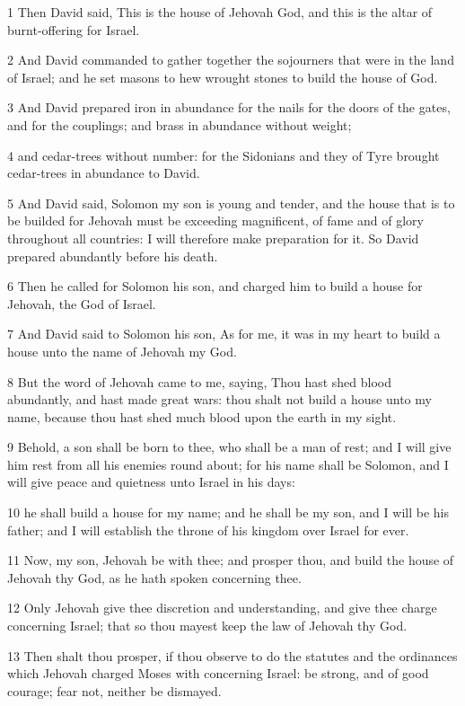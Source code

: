 \par 1 Then David said, This is the house of Jehovah God, and this is the altar of burnt-offering for Israel.
\par 2 And David commanded to gather together the sojourners that were in the land of Israel; and he set masons to hew wrought stones to build the house of God.
\par 3 And David prepared iron in abundance for the nails for the doors of the gates, and for the couplings; and brass in abundance without weight;
\par 4 and cedar-trees without number: for the Sidonians and they of Tyre brought cedar-trees in abundance to David.
\par 5 And David said, Solomon my son is young and tender, and the house that is to be builded for Jehovah must be exceeding magnificent, of fame and of glory throughout all countries: I will therefore make preparation for it. So David prepared abundantly before his death.
\par 6 Then he called for Solomon his son, and charged him to build a house for Jehovah, the God of Israel.
\par 7 And David said to Solomon his son, As for me, it was in my heart to build a house unto the name of Jehovah my God.
\par 8 But the word of Jehovah came to me, saying, Thou hast shed blood abundantly, and hast made great wars: thou shalt not build a house unto my name, because thou hast shed much blood upon the earth in my sight.
\par 9 Behold, a son shall be born to thee, who shall be a man of rest; and I will give him rest from all his enemies round about; for his name shall be Solomon, and I will give peace and quietness unto Israel in his days:
\par 10 he shall build a house for my name; and he shall be my son, and I will be his father; and I will establish the throne of his kingdom over Israel for ever.
\par 11 Now, my son, Jehovah be with thee; and prosper thou, and build the house of Jehovah thy God, as he hath spoken concerning thee.
\par 12 Only Jehovah give thee discretion and understanding, and give thee charge concerning Israel; that so thou mayest keep the law of Jehovah thy God.
\par 13 Then shalt thou prosper, if thou observe to do the statutes and the ordinances which Jehovah charged Moses with concerning Israel: be strong, and of good courage; fear not, neither be dismayed.
